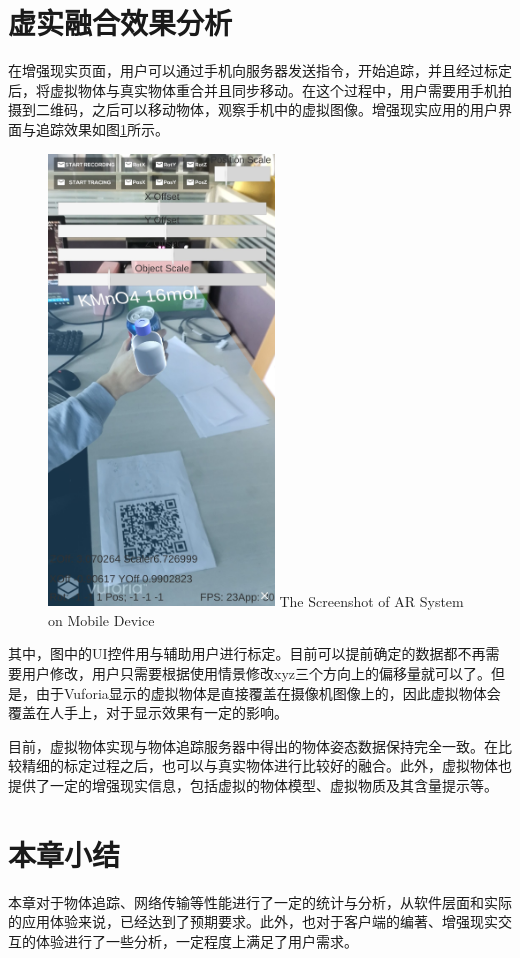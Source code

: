 \section{虚实融合效果分析}
在增强现实页面，用户可以通过手机向服务器发送指令，开始追踪，并且经过标定后，将虚拟物体与真实物体重合并且同步移动。在这个过程中，用户需要用手机拍摄到二维码，之后可以移动物体，观察手机中的虚拟图像。增强现实应用的用户界面与追踪效果如图\ref{fig:mAR}所示。

\begin{figure}[!htp]
  \centering
  \includegraphics[width=6cm]{figure/mobileTrace.jpg}
    {The Screenshot of AR System on Mobile Device}
 \label{fig:mAR}
\end{figure}

其中，图中的UI控件用与辅助用户进行标定。目前可以提前确定的数据都不再需要用户修改，用户只需要根据使用情景修改xyz三个方向上的偏移量就可以了。但是，由于Vuforia显示的虚拟物体是直接覆盖在摄像机图像上的，因此虚拟物体会覆盖在人手上，对于显示效果有一定的影响。

目前，虚拟物体实现与物体追踪服务器中得出的物体姿态数据保持完全一致。在比较精细的标定过程之后，也可以与真实物体进行比较好的融合。此外，虚拟物体也提供了一定的增强现实信息，包括虚拟的物体模型、虚拟物质及其含量提示等。

\section{本章小结}
本章对于物体追踪、网络传输等性能进行了一定的统计与分析，从软件层面和实际的应用体验来说，已经达到了预期要求。此外，也对于客户端的编著、增强现实交互的体验进行了一些分析，一定程度上满足了用户需求。
